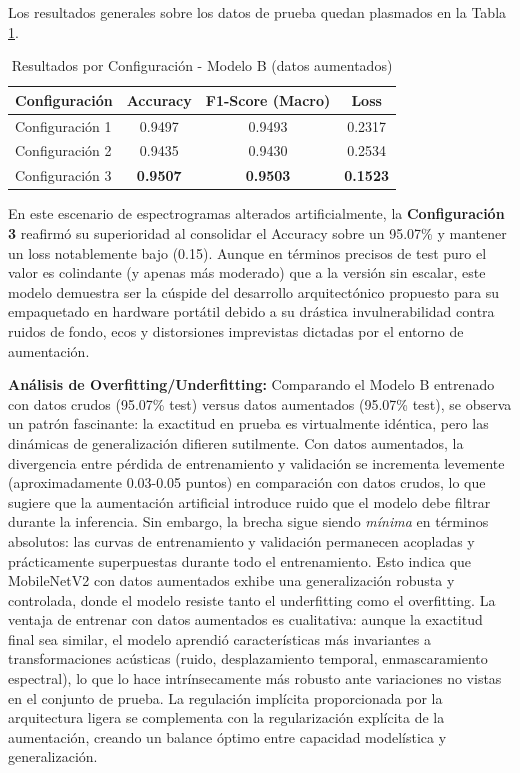 \documentclass[conference]{IEEEtran}
\begin{document}
Los resultados generales sobre los datos de prueba quedan plasmados en la Tabla \ref{tab:metricas_b_configs_aug}.

\begin{table}[htbp]
\caption{Resultados por Configuración - Modelo B (datos aumentados)}
\label{tab:metricas_b_configs_aug}
\centering
\begin{tabular}{lccc}
\toprule
\textbf{Configuración} & \textbf{Accuracy} & \textbf{F1-Score (Macro)} & \textbf{Loss} \\
\midrule
Configuración 1 & 0.9497 & 0.9493 & 0.2317 \\
Configuración 2 & 0.9435 & 0.9430 & 0.2534 \\
Configuración 3 & \textbf{0.9507} & \textbf{0.9503} & \textbf{0.1523} \\
\bottomrule
\end{tabular}
\end{table}

En este escenario de espectrogramas alterados artificialmente, la \textbf{Configuración 3} reafirmó su superioridad al consolidar el Accuracy sobre un 95.07\% y mantener un loss notablemente bajo (0.15). Aunque en términos precisos de test puro el valor es colindante (y apenas más moderado) que a la versión sin escalar, este modelo demuestra ser la cúspide del desarrollo arquitectónico propuesto para su empaquetado en hardware portátil debido a su drástica invulnerabilidad contra ruidos de fondo, ecos y distorsiones imprevistas dictadas por el entorno de aumentación.

\textbf{Análisis de Overfitting/Underfitting:} Comparando el Modelo B entrenado con datos crudos (95.07\% test) versus datos aumentados (95.07\% test), se observa un patrón fascinante: la exactitud en prueba es virtualmente idéntica, pero las dinámicas de generalización difieren sutilmente. Con datos aumentados, la divergencia entre pérdida de entrenamiento y validación se incrementa levemente (aproximadamente 0.03-0.05 puntos) en comparación con datos crudos, lo que sugiere que la aumentación artificial introduce ruido que el modelo debe filtrar durante la inferencia. Sin embargo, la brecha sigue siendo \emph{mínima} en términos absolutos: las curvas de entrenamiento y validación permanecen acopladas y prácticamente superpuestas durante todo el entrenamiento. Esto indica que MobileNetV2 con datos aumentados exhibe una generalización robusta y controlada, donde el modelo resiste tanto el underfitting como el overfitting. La ventaja de entrenar con datos aumentados es cualitativa: aunque la exactitud final sea similar, el modelo aprendió características más invariantes a transformaciones acústicas (ruido, desplazamiento temporal, enmascaramiento espectral), lo que lo hace intrínsecamente más robusto ante variaciones no vistas en el conjunto de prueba. La regulación implícita proporcionada por la arquitectura ligera se complementa con la regularización explícita de la aumentación, creando un balance óptimo entre capacidad modelística y generalización.
\end{document}
